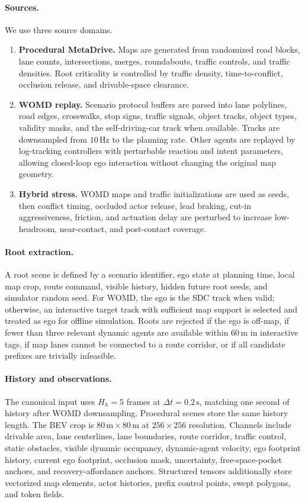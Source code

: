 \documentclass[conference]{IEEEtran}
\begin{document}
\paragraph{Sources.}
We use three source domains.
\begin{enumerate}[leftmargin=*]
    \item \textbf{Procedural MetaDrive.} Maps are generated from randomized road blocks, lane counts, intersections, merges, roundabouts, traffic controls, and traffic densities.  Root criticality is controlled by traffic density, time-to-conflict, occlusion release, and drivable-space clearance.
    \item \textbf{WOMD replay.} Scenario protocol buffers are parsed into lane polylines, road edges, crosswalks, stop signs, traffic signals, object tracks, object types, validity masks, and the self-driving-car track when available.  Tracks are downsampled from $10\,\mathrm{Hz}$ to the planning rate.  Other agents are replayed by log-tracking controllers with perturbable reaction and intent parameters, allowing closed-loop ego interaction without changing the original map geometry.
    \item \textbf{Hybrid stress.} WOMD maps and traffic initializations are used as seeds, then conflict timing, occluded actor release, lead braking, cut-in aggressiveness, friction, and actuation delay are perturbed to increase low-headroom, near-contact, and post-contact coverage.
\end{enumerate}

\paragraph{Root extraction.}
A root scene is defined by a scenario identifier, ego state at planning time, local map crop, route command, visible history, hidden future root seeds, and simulator random seed.  For WOMD, the ego is the SDC track when valid; otherwise, an interactive target track with sufficient map support is selected and treated as ego for offline simulation.  Roots are rejected if the ego is off-map, if fewer than three relevant dynamic agents are available within $60\,\mathrm{m}$ in interactive tags, if map lanes cannot be connected to a route corridor, or if all candidate prefixes are trivially infeasible.

\paragraph{History and observations.}
The canonical input uses $H_h=5$ frames at $\Delta t=0.2\,\mathrm{s}$, matching one second of history after WOMD downsampling.  Procedural scenes store the same history length.  The BEV crop is $80\,\mathrm{m}\times80\,\mathrm{m}$ at $256\times256$ resolution.  Channels include drivable area, lane centerlines, lane boundaries, route corridor, traffic control, static obstacles, visible dynamic occupancy, dynamic-agent velocity, ego footprint history, current ego footprint, occlusion mask, uncertainty, free-space-pocket anchors, and recovery-affordance anchors.  Structured tensors additionally store vectorized map elements, actor histories, prefix control points, swept polygons, and token fields.
\end{document}
